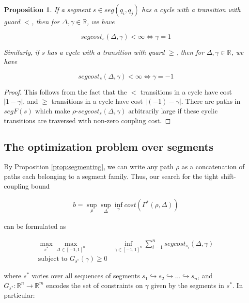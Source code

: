 \documentclass{article}
\newcommand{\R}{\mathbb{R}}
\newtheorem{proposition}{Proposition}[section]
\newcommand{\1}{\langle 1 \rangle}
\newcommand{\2}{\langle 2 \rangle}
\begin{document}
\begin{proposition}
    If a segment $s \in seg(q_i, q_j)$ has a cycle with a transition with guard $<$, then for $\Delta, \gamma \in \R$, we have 

    \[segcost_s(\Delta, \gamma) < \infty \iff \gamma = 1 \]

    Similarly, if $s$ has a cycle with a transition with guard $\geq$, then for $\Delta, \gamma \in \R$, we have

    \[segcost_s(\Delta, \gamma) < \infty \iff \gamma = -1\]
\end{proposition}

\begin{proof}
    This follows from the fact that the $<$ transitions in a cycle have cost $|1 - \gamma|$, and $\geq$ transitions in a cycle have cost $|(-1) - \gamma|$. There are paths in $segF(s)$ which make $\rho$-$segcost_s(\Delta, \gamma)$ arbitrarily large if these cyclic transitions are traversed with non-zero coupling cost.
\end{proof}

\subsection{The optimization problem over segments}

By Proposition \ref{prop:segmenting}, we can write any path $\rho$ as a concatenation of paths each belonging to a segment family. Thus, our search for the tight shift-coupling bound

\begin{align*}
    b = \sup_{\rho} \sup_{\Delta} \inf_{\gamma} cost(\Gamma^*(\rho, \Delta))
\end{align*}

can be formulated as 

\begin{align*}
    \max_{s^*} \max_{\Delta \in [-1, 1]^n} &\inf_{\gamma \in [-1, 1]^n} \sum_{i = 1}^n segcost_{s_i}(\Delta, \gamma) \\ 
    \text{subject to } G_{s^*}(\gamma) \geq 0
\end{align*}

where $s^*$ varies over all sequences of segments $s_1 \hookrightarrow s_2 \hookrightarrow \dots \hookrightarrow s_n$, and $G_{s^*} : \R^n \to \R^m$ encodes the set of constraints on $\gamma$ given by the segments in $s^*$. In particular: 
\end{document}
